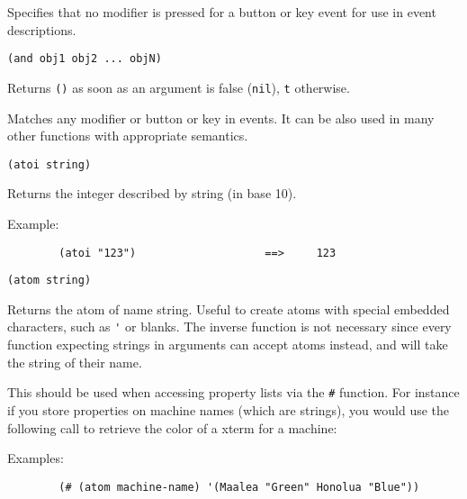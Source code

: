         

Specifies that no modifier is pressed for a button or key event for use in
event descriptions.

        
{\usagefont\begin{verbatim}
(and obj1 obj2 ... objN)
\end{verbatim}}\usageupspace

Returns \verb"()" as soon as an argument is false (\verb"nil"),
\verb"t" otherwise.

        

Matches any modifier or button or key in events. It can be also used in many
other functions with appropriate semantics.

        
{\usagefont\begin{verbatim}
(atoi string)
\end{verbatim}}\usageupspace

Returns the integer described by string (in base 10).

{Example:\exemplefont\upspace\begin{verbatim}
        (atoi "123")                    ==>     123
\end{verbatim}}

        
{\usagefont\begin{verbatim}
(atom string)
\end{verbatim}}\usageupspace

Returns the atom of name string. Useful to create atoms with special
embedded characters, such as \verb"'" or blanks. The inverse function is not
necessary since every {\WOOL} function expecting strings in arguments can
accept atoms instead, and will take the string of their name.  

This should be used when accessing property lists via the \verb|#| function.
For instance if you store properties on machine names (which are strings),
you would use the following call to retrieve the color of a xterm for a
machine:

{Examples:\exemplefont\upspace\begin{verbatim}
        (# (atom machine-name) '(Maalea "Green" Honolua "Blue"))
\end{verbatim}}

